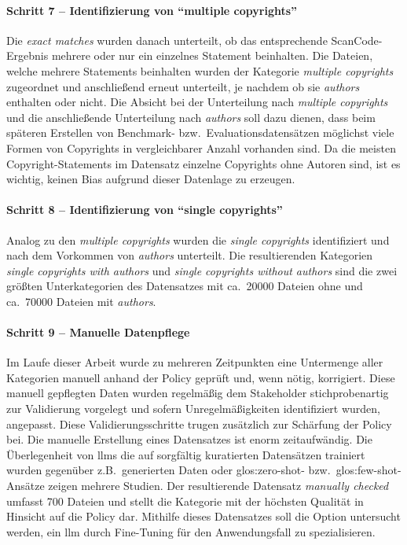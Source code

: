 \paragraph{Schritt 7 -- Identifizierung von \enquote{multiple copyrights}}
Die \textit{exact matches} wurden danach unterteilt, ob das entsprechende ScanCode-Ergebnis mehrere oder nur ein einzelnes Statement beinhalten.
Die Dateien, welche mehrere Statements beinhalten wurden der Kategorie \textit{multiple copyrights} zugeordnet und anschließend erneut unterteilt, je nachdem ob sie \textit{authors} enthalten oder nicht.
Die Absicht bei der Unterteilung nach \textit{multiple copyrights} und die anschließende Unterteilung nach \textit{authors} soll dazu dienen, dass beim späteren Erstellen von Benchmark- bzw.\ Evaluationsdatensätzen möglichst viele Formen von Copyrights in vergleichbarer Anzahl vorhanden sind.
Da die meisten Copyright-Statements im Datensatz einzelne Copyrights ohne Autoren sind, ist es wichtig, keinen Bias aufgrund dieser Datenlage zu erzeugen.

\paragraph{Schritt 8 -- Identifizierung von \enquote{single copyrights}}
Analog zu den \textit{multiple copyrights} wurden die \textit{single copyrights} identifiziert und nach dem Vorkommen von \textit{authors} unterteilt.
Die resultierenden Kategorien \textit{single copyrights with authors} und \textit{single copyrights without authors} sind die zwei größten Unterkategorien des Datensatzes mit ca.\ \num{20000} Dateien ohne und ca.\ \num{70000} Dateien mit \textit{authors}.

\paragraph{Schritt 9 -- Manuelle Datenpflege}
Im Laufe dieser Arbeit wurde zu mehreren Zeitpunkten eine Untermenge aller Kategorien manuell anhand der Policy geprüft und, wenn nötig, korrigiert.
Diese manuell gepflegten Daten wurden regelmäßig dem Stakeholder stichprobenartig zur Validierung vorgelegt und sofern Unregelmäßigkeiten identifiziert wurden, angepasst.
Diese Validierungsschritte trugen zusätzlich zur Schärfung der Policy bei.
Die manuelle Erstellung eines Datensatzes ist enorm zeitaufwändig.
Die Überlegenheit von \glspl{llm} die auf sorgfältig kuratierten Datensätzen trainiert wurden gegenüber z.B.\ generierten Daten oder \gls{glos:zero-shot}- bzw.\ \gls{glos:few-shot}-Ansätze zeigen mehrere Studien\autocite{breton_empowering_2024}\autocite{villena_llmner_2024}.
Der resultierende Datensatz \textit{manually checked} umfasst \num{700} Dateien und stellt die Kategorie mit der höchsten Qualität in Hinsicht auf die Policy dar.
Mithilfe dieses Datensatzes soll die Option untersucht werden, ein \gls{llm} durch Fine-Tuning für den Anwendungsfall zu spezialisieren.

